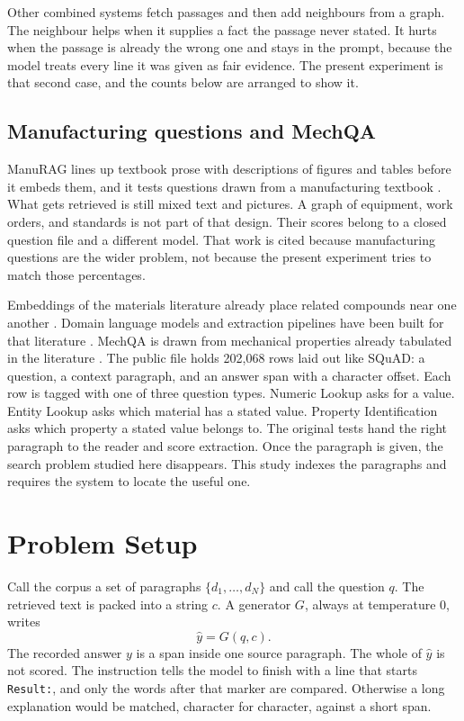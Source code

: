 \documentclass[conference]{IEEEtran}
\begin{document}
Other combined systems fetch passages and then add neighbours from a graph. The neighbour helps when it supplies a fact the passage never stated. It hurts when the passage is already the wrong one and stays in the prompt, because the model treats every line it was given as fair evidence. The present experiment is that second case, and the counts below are arranged to show it.

\subsection{Manufacturing questions and MechQA}
ManuRAG lines up textbook prose with descriptions of figures and tables before it embeds them, and it tests questions drawn from a manufacturing textbook \cite{li2026manurag}. What gets retrieved is still mixed text and pictures. A graph of equipment, work orders, and standards is not part of that design. Their scores belong to a closed question file and a different model. That work is cited because manufacturing questions are the wider problem, not because the present experiment tries to match those percentages.

Embeddings of the materials literature already place related compounds near one another \cite{tshitoyan2019nature}. Domain language models and extraction pipelines have been built for that literature \cite{gupta2022matscibert,olivetti2020apr,weston2019ner}. MechQA is drawn from mechanical properties already tabulated in the literature \cite{zhang2026mechqa}. The public file holds 202{,}068 rows laid out like SQuAD: a question, a context paragraph, and an answer span with a character offset. Each row is tagged with one of three question types. Numeric Lookup asks for a value. Entity Lookup asks which material has a stated value. Property Identification asks which property a stated value belongs to. The original tests hand the right paragraph to the reader and score extraction. Once the paragraph is given, the search problem studied here disappears. This study indexes the paragraphs and requires the system to locate the useful one.

\section{Problem Setup}
Call the corpus a set of paragraphs \(\{d_1,\ldots,d_N\}\) and call the question \(q\). The retrieved text is packed into a string \(c\). A generator \(G\), always at temperature 0, writes
\begin{equation}
\hat{y} = G(q, c).
\end{equation}
The recorded answer \(y\) is a span inside one source paragraph. The whole of \(\hat{y}\) is not scored. The instruction tells the model to finish with a line that starts \texttt{Result:}, and only the words after that marker are compared. Otherwise a long explanation would be matched, character for character, against a short span.
\end{document}
